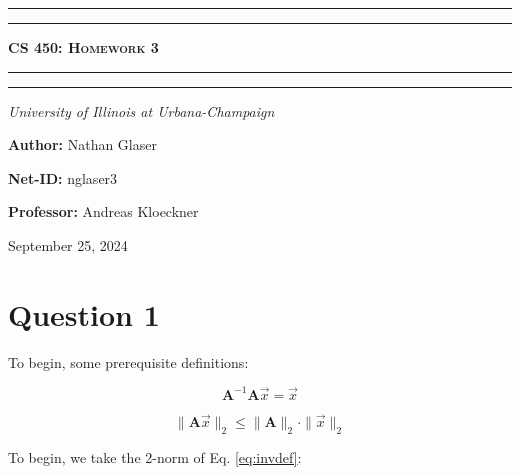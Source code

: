 \documentclass{article}
\begin{document}
\newcommand{\R}{${\rm I\!R}$}
\newcommand{\norm}[1]{\| #1 \|_2}
\newcommand{\nmv}[2]{\norm{\textbf{#1}\Vec{#2}}}
\newcommand{\abs}[1]{\bigl| #1 \bigr|}
\begin{titlepage}

\centering
\scshape
\vspace{\baselineskip}

%
\rule{\textwidth}{1.6pt}\vspace*{-\baselineskip}\vspace*{2pt}
\rule{\textwidth}{0.4pt}

{\Huge \textbf{\textsc{CS 450: Homework 3 \\
\vspace{15pt}}}}

\rule{\textwidth}{0.4pt}\vspace*{-\baselineskip}\vspace{3.2pt}
\rule{\textwidth}{1.6pt}\vspace{6pt}
\centerline{\textit{University of Illinois at Urbana-Champaign}} 
\vspace{1.5\baselineskip}


\large \centerline{\textbf{Author:} Nathan Glaser}
\large \centerline{\textbf{Net-ID:} nglaser3}
\quad

\large \centerline{\textbf{Professor:} Andreas Kloeckner}
\quad

\vfill
\large \centerline{September 25, 2024}
%
\end{titlepage}

\tableofcontents
\newpage
{}

\section*{Question 1}

To begin, some prerequisite definitions:

\begin{equation}
    \label{eq:invdef}
    \textbf{A}^{-1}\textbf{A}\Vec{x} = \Vec{x}
\end{equation}

\begin{equation}
    \norm{\textbf{A}\Vec{x}} \leq \norm{\textbf{A}}\cdot\norm{\Vec{x}}
    \label{eq:leqdef}
\end{equation}

To begin, we take the 2-norm of Eq. \ref{eq:invdef}:
\end{document}
